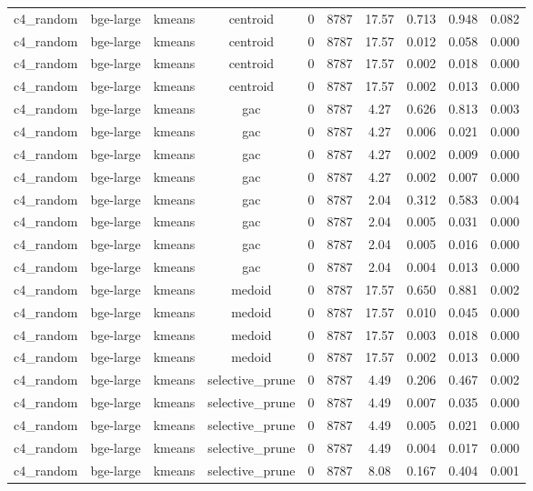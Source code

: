 \begin{longtable}{lccccccccc}
c4\_random & bge-large & kmeans & centroid & 0 & 8787 & 17.57 & 0.713 & 0.948 & 0.082 \\
c4\_random & bge-large & kmeans & centroid & 0 & 8787 & 17.57 & 0.012 & 0.058 & 0.000 \\
c4\_random & bge-large & kmeans & centroid & 0 & 8787 & 17.57 & 0.002 & 0.018 & 0.000 \\
c4\_random & bge-large & kmeans & centroid & 0 & 8787 & 17.57 & 0.002 & 0.013 & 0.000 \\
c4\_random & bge-large & kmeans & gac & 0 & 8787 & 4.27 & 0.626 & 0.813 & 0.003 \\
c4\_random & bge-large & kmeans & gac & 0 & 8787 & 4.27 & 0.006 & 0.021 & 0.000 \\
c4\_random & bge-large & kmeans & gac & 0 & 8787 & 4.27 & 0.002 & 0.009 & 0.000 \\
c4\_random & bge-large & kmeans & gac & 0 & 8787 & 4.27 & 0.002 & 0.007 & 0.000 \\
c4\_random & bge-large & kmeans & gac & 0 & 8787 & 2.04 & 0.312 & 0.583 & 0.004 \\
c4\_random & bge-large & kmeans & gac & 0 & 8787 & 2.04 & 0.005 & 0.031 & 0.000 \\
c4\_random & bge-large & kmeans & gac & 0 & 8787 & 2.04 & 0.005 & 0.016 & 0.000 \\
c4\_random & bge-large & kmeans & gac & 0 & 8787 & 2.04 & 0.004 & 0.013 & 0.000 \\
c4\_random & bge-large & kmeans & medoid & 0 & 8787 & 17.57 & 0.650 & 0.881 & 0.002 \\
c4\_random & bge-large & kmeans & medoid & 0 & 8787 & 17.57 & 0.010 & 0.045 & 0.000 \\
c4\_random & bge-large & kmeans & medoid & 0 & 8787 & 17.57 & 0.003 & 0.018 & 0.000 \\
c4\_random & bge-large & kmeans & medoid & 0 & 8787 & 17.57 & 0.002 & 0.013 & 0.000 \\
c4\_random & bge-large & kmeans & selective\_prune & 0 & 8787 & 4.49 & 0.206 & 0.467 & 0.002 \\
c4\_random & bge-large & kmeans & selective\_prune & 0 & 8787 & 4.49 & 0.007 & 0.035 & 0.000 \\
c4\_random & bge-large & kmeans & selective\_prune & 0 & 8787 & 4.49 & 0.005 & 0.021 & 0.000 \\
c4\_random & bge-large & kmeans & selective\_prune & 0 & 8787 & 4.49 & 0.004 & 0.017 & 0.000 \\
c4\_random & bge-large & kmeans & selective\_prune & 0 & 8787 & 8.08 & 0.167 & 0.404 & 0.001 \\

\end{longtable}
